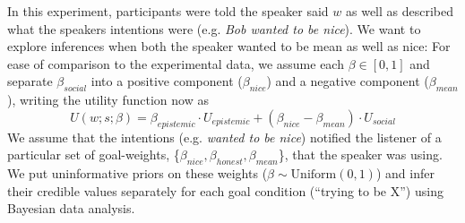 \documentclass[10pt,letterpaper]{article}
\begin{document}
In this experiment, participants were told the speaker said $w$ as well as described what the speakers intentions were (e.g. \emph{Bob wanted to be nice}). 
We want to explore inferences when both the speaker wanted to be mean as well as nice: For ease of comparison to the experimental data, we assume each $\beta \in [0,1]$ and separate $\beta_{social}$ into a positive component ($\beta_{nice}$) and a negative component ($\beta_{mean}$), writing the utility function now as
$$
 U(w;s; \beta)  =  \beta_{epistemic}\cdot U_{epistemic} + (\beta_{nice} - \beta_{mean}) \cdot U_{social}
 $$ 
We assume that the intentions (e.g. \emph{wanted to be nice}) notified the listener of a particular set of goal-weights, \{$\beta_{nice}, \beta_{honest}, \beta_{mean}$\}, that the speaker was using. 
We put uninformative priors on these weights ($\beta \sim \text{Uniform}(0,1)$) and infer their credible values separately for each goal condition (``trying to be X'') using Bayesian data analysis.
\end{document}
